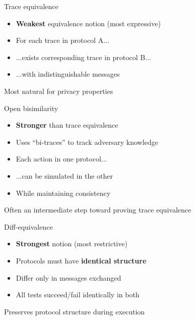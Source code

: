 \documentclass[aspectratio=169, lualatex, handout]{beamer}
\begin{document}
\begin{frame}{Trace equivalence}
	\begin{itemize}
		\item \textbf{Weakest} equivalence notion (most expressive)
		\item For each trace in protocol A...
		\item ...exists corresponding trace in protocol B...
		\item ...with indistinguishable messages
	\end{itemize}
	\vspace{1em}
	\begin{center}
		\Large
		Most natural for privacy properties
	\end{center}
\end{frame}

\begin{frame}{Open bisimilarity}
	\begin{itemize}
		\item \textbf{Stronger} than trace equivalence
		\item Uses ``bi-traces'' to track adversary knowledge
		\item Each action in one protocol...
		\item ...can be simulated in the other
		\item While maintaining consistency
	\end{itemize}
	\vspace{1em}
	\begin{center}
		Often an intermediate step toward proving trace equivalence
	\end{center}
\end{frame}

\begin{frame}{Diff-equivalence}
	\begin{itemize}
		\item \textbf{Strongest} notion (most restrictive)
		\item Protocols must have \textbf{identical structure}
		\item Differ only in messages exchanged
		\item All tests succeed/fail identically in both
	\end{itemize}
	\vspace{1em}
	\begin{center}
		Preserves protocol structure during execution
	\end{center}
\end{frame}
\end{document}
